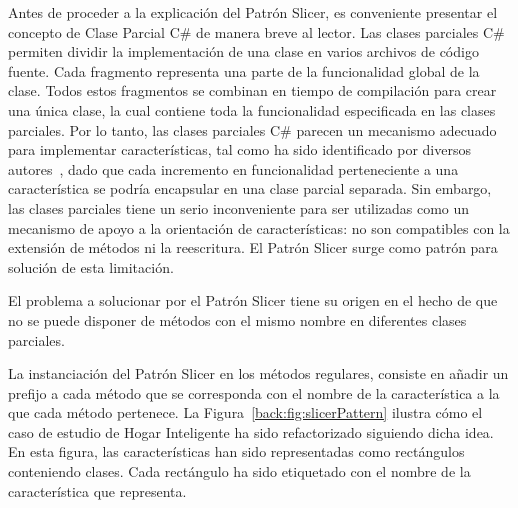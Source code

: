 
Antes de proceder a la explicación del Patrón Slicer, es conveniente presentar el concepto de Clase Parcial C\# de manera breve al lector. Las clases parciales C\#~\cite{albahari:2010} permiten dividir la implementación de una clase en varios archivos de código fuente. Cada fragmento representa una parte de la funcionalidad global de la clase. Todos estos fragmentos se combinan en tiempo de compilación para crear una única clase, la cual contiene toda la funcionalidad especificada en las clases parciales. Por lo tanto, las clases parciales C\# parecen un mecanismo adecuado para implementar características, tal como ha sido identificado por diversos autores~\cite{laguna:2007,laguna:2010}, dado que cada incremento en funcionalidad perteneciente a una característica se podría encapsular en una clase parcial separada. Sin embargo, las clases parciales tiene un serio inconveniente para ser utilizadas como un mecanismo de apoyo a la orientación de características: no son compatibles con la extensión de métodos ni la reescritura. El Patrón Slicer surge como patrón para solución de esta limitación.

El problema a solucionar por el Patrón Slicer tiene su origen en el hecho de que no se puede disponer de métodos con el mismo nombre en diferentes clases parciales.

La instanciación del Patrón Slicer en los métodos regulares, consiste en añadir un prefijo a cada método que se corresponda con el nombre de la característica a la que cada método pertenece. La Figura~\ref{back:fig:slicerPattern} ilustra cómo el caso de estudio de Hogar Inteligente ha sido refactorizado siguiendo dicha idea. En esta figura, las características han sido representadas como rectángulos conteniendo clases. Cada rectángulo ha sido etiquetado con el nombre de la característica que representa.

